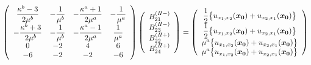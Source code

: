 \begin{align}
	\left(
	\begin{array}{cccc}
		{\displaystyle\frac{ \kappa^b-3}{2\mu^{b}}}& {\displaystyle-\frac{1}{\mu^{b}}} &
		{\displaystyle-\frac{\kappa^a+1}{2\mu^{a}}} & {\displaystyle-\frac{1}{\mu^{a}}} \\
		{\displaystyle-\frac{\kappa^b+3}{2\mu^{b}}} & {\displaystyle-\frac{1}{\mu^{b}}} &
		{\displaystyle-\frac{\kappa^a-1}{2\mu^{a}}} & {\displaystyle\frac{1}{\mu^{a}}} \\
		0 & -2 & 4 & 6 \\
		-6 & -2 & -2 & -6\\
	\end{array}
	\right)
	\left(
	\begin{array}{c}
		B_{21}^{(I\hspace{-.15em}I-)} \\
	 	B_{23}^{(I\hspace{-.15em}I-)} \\
		B_{22}^{(I\hspace{-.15em}I+)}\\
	 	B_{24}^{(I\hspace{-.15em}I+)} \\
	\end{array}
	\right)
	=
	\left(
	\begin{array}{c}
		{\displaystyle\frac{1}{2}\bigl\{u_{x_{1},x_{2}}(\bm{x_{0}})+u_{x_{2},x_{1}}(\bm{x_{0}})\bigr\}} \\
	 	{\displaystyle\frac{1}{2}\bigl\{u_{x_{1},x_{2}}(\bm{x_{0}})+u_{x_{2},x_{1}}(\bm{x_{0}})\bigr\}} \\
		{\displaystyle\mu^a\bigl\{u_{x_{1},x_{2}}(\bm{x_{0}})+u_{x_{2},x_{1}}(\bm{x_{0}})\bigr\}} \\
	 	{\displaystyle\mu^a \bigl\{u_{x_{1},x_{2}}(\bm{x_{0}})+u_{x_{2},x_{1}}(\bm{x_{0}})\bigr\}} \\
	\end{array}
	\right)
\end{align}

